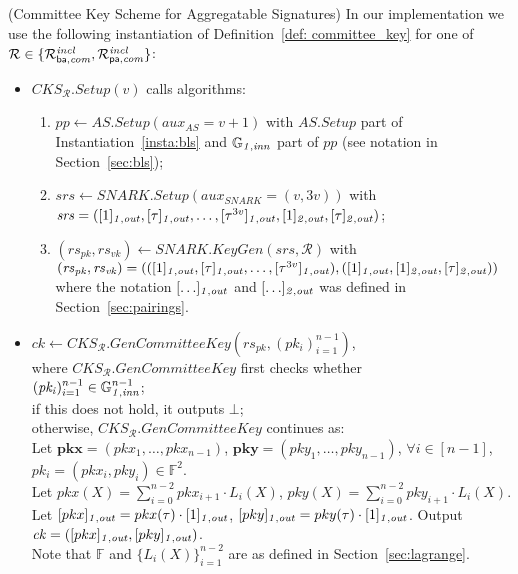 \begin{construction}(Committee Key Scheme for Aggregatable Signatures)
\label{inst:cks} In our implementation we use the following instantiation of Definition~\ref{def: committee_key} for one of $\mathcal{R} \in \{\mathcal{R}^{\mathit{incl}}_{\mathsf{ba},\mathit{com}}, \mathcal{R}^{\mathit{incl}}_{\mathsf{pa},\mathit{com}}\}$:
\begin{itemize}
\item $\mathit{CKS_{\mathcal{R}}.Setup}(v)$ calls algorithms: 
\begin{enumerate}
\item $\mathit{pp} \leftarrow \mathit{AS.Setup}(\mathit{aux_{\mathit{AS}}}= v+1)$ with  $\mathit{AS.Setup}$ part of Instantiation~\ref{insta:bls} and 
$\mathbb{G}_{\mathit{1,inn}}$ part of $\mathit{pp}$ (see notation in Section~\ref{sec:bls});
\item $\mathit{srs} \leftarrow \mathit{SNARK.Setup}(\mathit{aux_{\mathit{SNARK}}} = (v, 3v))$ with \\
$\mathit{srs}=([1]_{\mathit{1,out}}, [\tau]_{\mathit{1,out}}, \ldots, [\tau^{3v}]_{\mathit{1,out}}, [1]_{\mathit{2,out}}, [\tau]_{\mathit{2,out}})$;
\item $(\mathit{rs}_{\mathit{pk}}, \mathit{rs}_{\mathit{vk}}) \leftarrow \mathit{SNARK.KeyGen}(\mathit{srs}, \mathcal{R})$ with \\ 
$(\mathit{rs}_{\mathit{pk}}, \mathit{rs}_{\mathit{vk}}) =  (([1]_{\mathit{1,out}}, [\tau]_{\mathit{1,out}}, \ldots, [\tau^{3v}]_{\mathit{1,out}}), \\ 
([1]_{\mathit{1,out}}, [1]_{\mathit{2,out}}, [\tau]_{\mathit{2,out}}))$ where %
the notation $[\ldots]_{\mathit{1,out}}$ and $[\ldots]_{\mathit{2,out}}$ was defined in Section~\ref{sec:pairings}.
\end{enumerate}

\item $\mathit{ck} \leftarrow \mathit{CKS_{\mathcal{R}}.GenCommitteeKey}(\mathit{rs_{pk}}, (\mathit{pk_i})_{i=1}^{n-1})$,\\ where 
$\mathit{CKS_{\mathcal{R}}.GenCommitteeKey}$ first checks whether \\ $(\mathit{pk_i})_{i=1}^{n-1} \in \mathbb{G}_{\mathit{1,inn}}^{n-1}$; \\ if this does not hold, it outputs $\bot$; \\
otherwise, $\mathit{CKS_{\mathcal{R}}.GenCommitteeKey}$ continues as: \\
\noindent Let $\mathbf{pkx} = (\mathit{pkx_{1}}, \ldots, \mathit{pkx_{n-1}})$, $\mathbf{pky} = (\mathit{pky_{1}}, \ldots, \mathit{pky_{n-1}})$, $\forall i \in [n-1]$, $\mathit{pk_i} = (\mathit{pkx_i}, \mathit{pky_i}) \in \mathbb{F}^{2}$. \\
\noindent Let $pkx(X) = \sum_{i=0}^{n-2} \mathit{pkx_{i+1}} \cdot L_i(X)$, $pky(X) = \sum_{i=0}^{n-2} \mathit{pky_{i+1}} \cdot L_i(X)$. Let $[pkx]_{\mathit{1,out}} = pkx(\tau) \cdot [1]_{\mathit{1,out}}$, $[pky]_{\mathit{1,out}} = pky(\tau) \cdot [1]_{\mathit{1,out}}$. Output $\mathit{ck} = ([pkx]_{\mathit{1,out}}, [pky]_{\mathit{1,out}})$.\\
\noindent Note that $\mathbb{F}$ and $\{L_i(X)\}_{i=1}^{n-2}$ are as defined in Section~\ref{sec:lagrange}. 


\end{itemize}
\end{construction}
